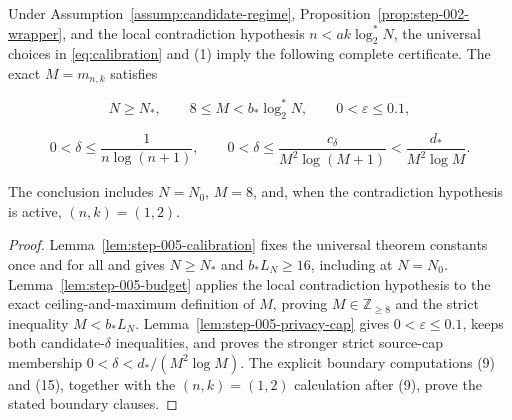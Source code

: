 \begin{proposition}\label{prop:step-005-certificate}
Under Assumption~\ref{assump:candidate-regime}, Proposition~\ref{prop:step-002-wrapper}, and the local contradiction
hypothesis \(n<ak\log_2^*N\), the universal choices in
\eqref{eq:calibration} and (1) imply
the following complete certificate.  The exact \(M=m_{n,k}\) satisfies

\[
N\ge N_*,
\qquad 8\le M<b_*\log_2^*N,
\qquad 0<\varepsilon\le0.1,
\]

\[
0<\delta\le\frac1{n\log(n+1)},
\qquad
0<\delta\le\frac{c_\delta}{M^2\log(M+1)}
<\frac{d_*}{M^2\log M}.
\]

The conclusion includes \(N=N_0\), \(M=8\), and, when the contradiction
hypothesis is active, \((n,k)=(1,2)\).
\end{proposition}

\begin{proof}
Lemma~\ref{lem:step-005-calibration} fixes the universal theorem constants
once and for all and gives \(N\ge N_*\) and \(b_*L_N\ge16\), including at
\(N=N_0\). Lemma~\ref{lem:step-005-budget} applies the local contradiction
hypothesis to the exact ceiling-and-maximum definition of \(M\), proving
\(M\in\mathbb Z_{\ge8}\) and the strict inequality \(M<b_*L_N\).
Lemma~\ref{lem:step-005-privacy-cap} gives \(0<\varepsilon\le0.1\), keeps
both candidate-$\delta$ inequalities, and proves the stronger strict
source-cap membership \(0<\delta<d_*/(M^2\log M)\).
The explicit boundary computations (9) and (15), together with the
\((n,k)=(1,2)\) calculation after (9), prove the stated boundary clauses.
\end{proof}
